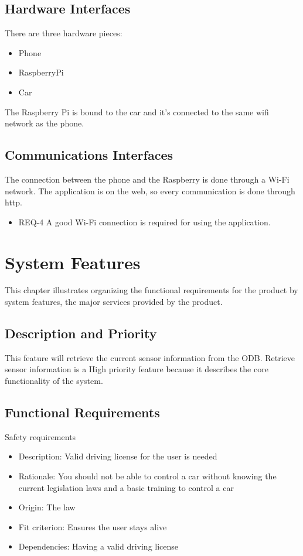\documentclass{scrreprt}
\begin{document}
\section{Hardware Interfaces}
There are three hardware pieces: 
\begin{itemize}
\item Phone
\item RaspberryPi
\item Car
\end{itemize}

The Raspberry Pi is bound to the car and it's connected to the same wifi network as the phone.
 

\section{Communications Interfaces}
The connection between the phone and the Raspberry is done through a Wi-Fi network. The application is on the web, so every communication is done through http.
\begin{itemize}
\item REQ-4 A good Wi-Fi connection is required for using the application.
\end{itemize}


\chapter{System Features}
This chapter illustrates organizing the functional requirements for the product by system features,
the major services provided by the product.


\section{Description and Priority}
This feature will retrieve the current sensor information from the ODB.
Retrieve sensor information is a High priority feature because it describes the core functionality of the system.

\section{Functional Requirements}
Safety requirements
\begin{itemize}
\item Description: Valid driving license for the user is needed
\item Rationale: You should not be able to control a car without knowing the current legislation laws and a basic training to control a car
\item Origin: The law
\item Fit criterion: Ensures the user stays alive
\item Dependencies: Having a valid driving license
\end{itemize}
\end{document}
